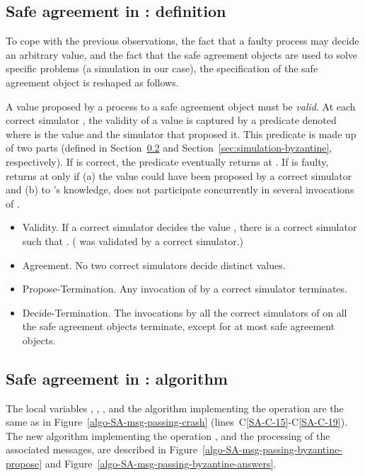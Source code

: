 \documentclass[11pt,letterpaper]{article}
\begin{document}
\subsection{Safe agreement in  : definition}
\label{sec:spec-Byzantine-SA}
To cope with  the previous observations, the fact that
a faulty process may decide an arbitrary  value,
and the fact  that the safe agreement objects are used  to solve
specific problems (a simulation in our case),
the specification of the safe agreement object is reshaped as follows.

A value proposed by a process to a safe agreement object must be
{\it valid}. At each correct simulator , the validity of a value is 
captured by a predicate denoted 
where  is the value and  the simulator that proposed it.
This predicate is made up of two parts (defined in Section~\ref{sec:is-valid} 
and  Section~\ref{sec:simulation-byzantine}, respectively).
If  is correct, the predicate  eventually 
returns  at . If
 is faulty,    returns   at 
only if
 (a) the value   could have been proposed by a correct simulator and (b) 
 to 's knowledge,  does not participate concurrently in several 
invocations of  .
\vspace{-0.1cm}
\begin{itemize}
\item Validity.
If a correct simulator  decides the value , there is 
a correct simulator  such that .
( was validated by a correct simulator.)
\vspace{-0.2cm}
\item Agreement. No two correct simulators decide distinct values.
\vspace{-0.2cm}
\item Propose-Termination.
Any invocation of   by a correct simulator terminates.
\vspace{-0.2cm}
\item Decide-Termination.
The invocations by all the correct simulators  of 
on all the safe agreement objects terminate, except for at most 
safe agreement objects.
\end{itemize}


\subsection{Safe agreement in  : algorithm}
\label{sec:is-valid}

The local variables , ,
,  and the algorithm implementing the operation
 are the same as in Figure~\ref{algo-SA-msg-passing-crash}
(lines~C\ref{SA-C-15}-C\ref{SA-C-19}).
The  new algorithm implementing the  operation , and the
processing of the associated messages, are  described in
Figure~\ref{algo-SA-msg-passing-byzantine-propose} and
Figure~\ref{algo-SA-msg-passing-byzantine-answers}.
\end{document}
